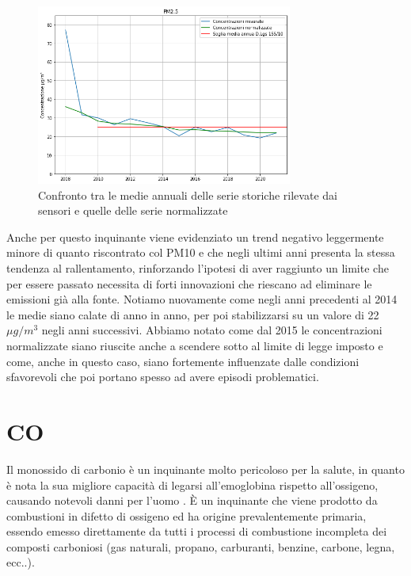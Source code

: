 \documentclass[a4paper]{report}
\begin{document}
\begin{figure}[h]
\centering
\includegraphics[width=0.75\textwidth]{pm25_medie_annuali}
\caption{Confronto tra le medie annuali delle serie storiche rilevate dai sensori e quelle delle serie normalizzate}
\label{fig:pm25_medie_annuali}
\end{figure}

Anche per questo inquinante viene evidenziato un trend negativo leggermente minore di quanto riscontrato col PM10 e che negli ultimi anni presenta la stessa tendenza al rallentamento, rinforzando l'ipotesi
di aver raggiunto un limite che per essere passato necessita di forti innovazioni che riescano ad eliminare le emissioni già alla fonte. Notiamo nuovamente come negli anni precedenti al 2014 le medie siano calate di anno in anno, per poi stabilizzarsi su un valore di 22$\mu g/m^3$ negli anni successivi.
Abbiamo notato come dal 2015 le concentrazioni normalizzate siano riuscite anche a scendere sotto al limite di legge imposto e come, anche in questo caso, siano fortemente influenzate dalle condizioni sfavorevoli che poi portano spesso ad avere episodi problematici.


\section{CO}
Il monossido di carbonio è un inquinante molto pericoloso per la salute, in quanto è nota la sua migliore capacità di legarsi all'emoglobina rispetto all'ossigeno, causando notevoli danni per l'uomo \cite{kao2005carbon}.
È un inquinante che viene prodotto da combustioni in difetto di ossigeno ed ha origine prevalentemente primaria, essendo emesso direttamente da tutti i processi di combustione incompleta dei composti carboniosi (gas naturali, propano, carburanti, benzine, carbone, legna, ecc..).
\end{document}
